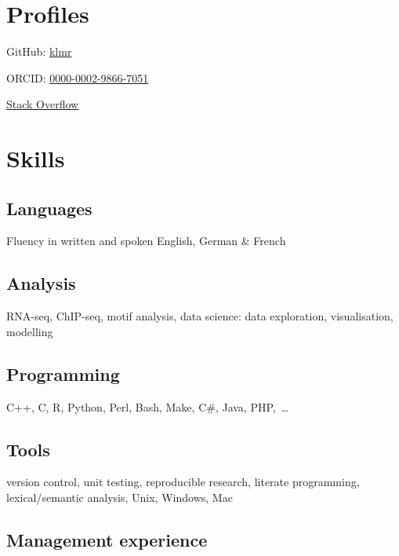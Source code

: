 \documentclass{klmr-cv}
\newcommand*\csharp{C\#}
\newcommand*\cpp{C++}
\begin{document}
\date{2003}
\item{}

\section{Profiles}

\item{GitHub: \href{http://github.com/klmr}{klmr}}
\item{ORCID: \href{http://orcid.org/0000-0002-9866-7051}{0000-0002-9866-7051}}
\item{\href{http://stackoverflow.com/users/1968/konrad-rudolph}{Stack Overflow}}

\section{Skills}

\subsection{Languages}

\item{Fluency in written and spoken English, German \& French}

\subsection{Analysis}

\item{RNA-seq, ChIP-seq, motif analysis, data science: data exploration,
    visualisation, modelling}

\subsection{Programming}

\item{\cpp, C, R, Python, Perl, Bash, Make, \csharp, Java, PHP,~…}

\subsection{Tools}

\item{version control, unit testing, reproducible research, literate
    programming, lexical/semantic analysis, Unix, Windows, Mac}

\subsection{Management experience}
\end{document}
